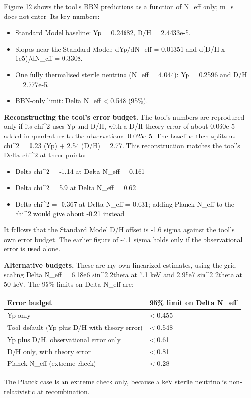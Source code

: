 \documentclass[11pt,a4paper]{article}
\begin{document}
Figure 12 shows the tool's BBN predictions as a function of N\_eff only; m\_s does not enter. Its key numbers:

\begin{itemize}
  \item Standard Model baseline: Yp = 0.24682, D/H = 2.4433e-5.
  \item Slopes near the Standard Model: dYp/dN\_eff = 0.01351 and d(D/H x 1e5)/dN\_eff = 0.3308.
  \item One fully thermalised sterile neutrino (N\_eff = 4.044): Yp = 0.2596 and D/H = 2.777e-5.
  \item BBN-only limit: Delta N\_eff \textless{} 0.548 (95\%).
\end{itemize}
\textbf{Reconstructing the tool's error budget.} The tool's numbers are reproduced only if its chi\textasciicircum{}2 uses Yp and D/H, with a D/H theory error of about 0.060e-5 added in quadrature to the observational 0.025e-5. The baseline then splits as chi\textasciicircum{}2 = 0.23 (Yp) + 2.54 (D/H) = 2.77. This reconstruction matches the tool's Delta chi\textasciicircum{}2 at three points:

\begin{itemize}
  \item Delta chi\textasciicircum{}2 = -1.14 at Delta N\_eff = 0.161
  \item Delta chi\textasciicircum{}2 = 5.9 at Delta N\_eff = 0.62
  \item Delta chi\textasciicircum{}2 = -0.367 at Delta N\_eff = 0.031; adding Planck N\_eff to the chi\textasciicircum{}2 would give about -0.21 instead
\end{itemize}
It follows that the Standard Model D/H offset is -1.6 sigma against the tool's own error budget. The earlier figure of -4.1 sigma holds only if the observational error is used alone.

\textbf{Alternative budgets.} These are my own linearized estimates, using the grid scaling Delta N\_eff = 6.18e6 sin\textasciicircum{}2 2theta at 7.1 keV and 2.95e7 sin\textasciicircum{}2 2theta at 50 keV. The 95\% limits on Delta N\_eff are:

\begin{longtable}{@{}p{}p{}@{}}
\toprule
\textbf{Error budget} & \textbf{95\% limit on Delta N\_eff} \\ \midrule \endhead
Yp only & \textless{} 0.455 \\
Tool default (Yp plus D/H with theory error) & \textless{} 0.548 \\
Yp plus D/H, observational error only & \textless{} 0.61 \\
D/H only, with theory error & \textless{} 0.81 \\
Planck N\_eff (extreme check) & \textless{} 0.28 \\
\bottomrule\end{longtable}
The Planck case is an extreme check only, because a keV sterile neutrino is non-relativistic at recombination.
\end{document}
